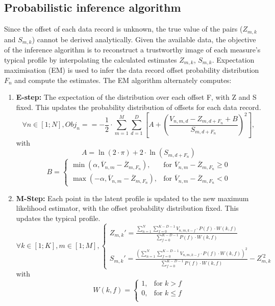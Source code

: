 \subsection{Probabilistic inference algorithm}
Since the offset of each data record is unknown, the true value of the pairs ($Z_{m,k}$ and $S_{m,k}$) cannot be derived analytically. Given the available data, the objective of the inference algorithm is to reconstruct a trustworthy image of each measure's typical profile by interpolating the calculated estimates $Z_{m,k}$, $S_{m,k}$. Expectation maximisation (EM) \cite{neal_1998} \cite{billard_2018} is used to infer the data record offset probability distribution $F_n$ and compute the estimates. The EM algorithm alternately computes:
\begin{enumerate}
    \item \textbf{E-step:} The expectation of the distribution over each offset F, with Z and S fixed. This updates the probability distribution of offsets for each data record.
    \begin{equation}\label{eq:obj}
    \forall n \in [1;N], Obj_n = = -\frac{1}{2} \cdot \sum_{m=1}^M \sum_{d=1}^D \left[ A + \left( \frac{V_{n,m,d} - Z_{m,d+F_n} + B}{ S_{m,d+F_n} } \right)^2 \right],
\end{equation} 
with
\begin{equation}
    A = \ln(2\cdot \pi) + 2\cdot \ln( S_{m,d+F_n} )
\end{equation}
\begin{equation}
    B = 
    \begin{cases}
        \min (\alpha, \overline{V}_{n,m} - \overline{Z}_{m,F_n} ), & \text{for } \overline{V}_{n,m} - \overline{Z}_{m,F_n} \geq 0\\
        \max (-\alpha, \overline{V}_{n,m} - \overline{Z}_{m,F_n} ), & \text{for } \overline{V}_{n,m} - \overline{Z}_{m,F_n} < 0
    \end{cases}
\end{equation}
    \item \textbf{M-Step:} Each point in the latent profile is updated to the new maximum likelihood estimator, with the offset probability distribution fixed. This updates the typical profile.
\begin{equation}
    \forall k \in [1;K], m \in [1;M],
    \begin{cases}
        Z_{m,k}' = \frac{ \sum_{n=1}^N \sum_{f=0}^{K-D-1} V_{n,m,k-f} \cdot P(f) \cdot W(k,f) }{ \sum_{f=0}^{K-D-1} P(f)\cdot W(k,f) }\\\\
        S_{m,k}' = \frac{\left( \sum_{n=1}^N \sum_{f=0}^{K-D-1} V_{n,m,k-f} \cdot P(f) \cdot W(k,f) \right)^2}{ \sum_{f=0}^{K-D-1} P(f)\cdot W(k,f) } - Z_{m,k}^{'2}
    \end{cases}
\end{equation}
with
\begin{equation}
    W(k,f) = 
    \begin{cases}
        1, & \text{for } k > f\\
        0, & \text{for } k \leq f\\
    \end{cases}
\end{equation}
\end{enumerate}

